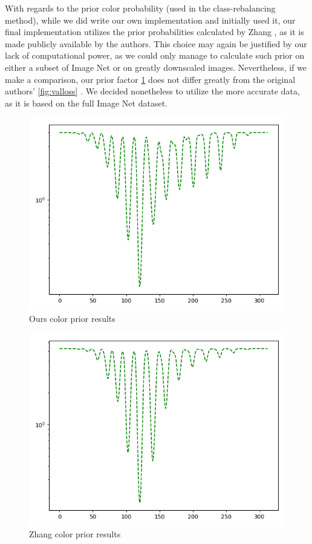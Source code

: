 \documentclass[twoside,twocolumn]{article}
\begin{document}
With regards to the prior color probability (used in the class-rebalancing method), while we did write our own implementation and initially used it, our final implementation utilizes the prior probabilities calculated by Zhang \cite{Zhang:2016}, as it is made publicly available by the authors. This choice may again be justified by our lack of computational power, as we could only manage to calculate such prior on either a subset of Image Net or on greatly downscaled images. Nevertheless, if we make a comparison, our prior factor \ref{fig:oursprior} does not differ greatly from the original authors’ \ref{fig:valloss} . We decided nonetheless to utilize the more accurate data, as it is based on the full Image Net dataset.


\begin{figure}
	\includegraphics[width=\linewidth]{img/ours.png}
	\caption{Ours color prior results}
	\label{fig:oursprior}
\end{figure}

\begin{figure}
	\includegraphics[width=\linewidth]{img/zhang.png}
	\caption{Zhang \cite{Zhang:2016} color prior results}
	\label{fig:zhangprior}
\end{figure}
\end{document}
